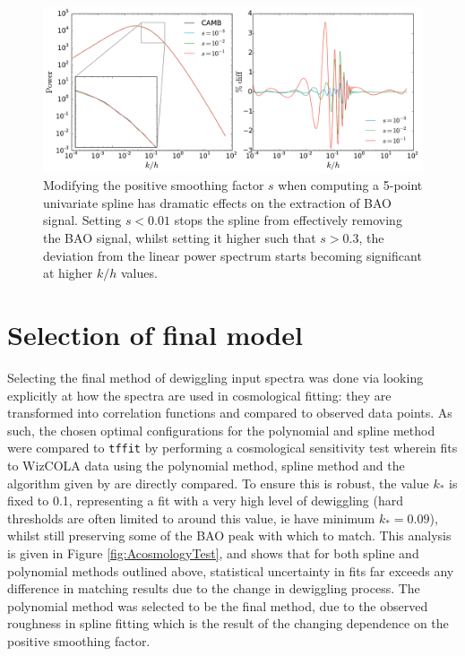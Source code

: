\documentclass[titlesmallcaps, examinerscopy, copyrightpage]{uqthesis}
\begin{document}
\begin{appendices}
\begin{figure}[h!]
  \begin{center}
    \includegraphics[width=\textwidth]{images/AsplineSmooth.pdf}
  	\caption{Modifying the positive smoothing factor $s$ when computing a 5-point univariate spline has dramatic effects on the extraction of BAO signal. Setting $s < 0.01$ stops the spline from effectively removing the BAO signal, whilst setting it higher such that $s > 0.3$, the deviation from the linear power spectrum starts becoming significant at higher $k/h$ values.}
  	\label{fig:AsplineSmooth}
  \end{center}
\end{figure}

\section{Selection of final model}

Selecting the final method of dewiggling input spectra was done via looking explicitly at how the spectra are used in cosmological fitting: they are transformed into correlation functions and compared to observed data points. As such, the chosen optimal configurations for the polynomial and spline method were compared to \verb;tffit; by performing a cosmological sensitivity test wherein fits to WizCOLA data using the polynomial method, spline method and the algorithm given by \citet{EisensteinHu1998} are directly compared. To ensure this is robust, the value $k_*$ is fixed to 0.1, representing a fit with a very high level of dewiggling (hard thresholds are often limited to around this value, ie \citet{ChuangWang2012} have minimum $k_* = 0.09$), whilst still preserving some of the BAO peak with which to match. This analysis is given in Figure \ref{fig:AcosmologyTest}, and shows that for both spline and polynomial methods outlined above, statistical uncertainty in fits far exceeds any difference in matching results due to the change in dewiggling process. The polynomial method was selected to be the final method, due to the observed roughness in spline fitting which is the result of the changing dependence on the positive smoothing factor.



\end{appendices}
\end{document}
